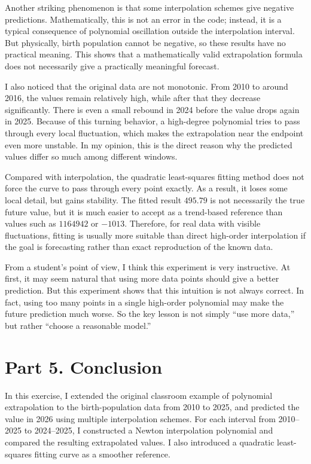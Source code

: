\documentclass[12pt,a4paper]{article}
\begin{document}
Another striking phenomenon is that some interpolation schemes give negative predictions. Mathematically, this is not an error in the code; instead, it is a typical consequence of polynomial oscillation outside the interpolation interval. But physically, birth population cannot be negative, so these results have no practical meaning. This shows that a mathematically valid extrapolation formula does not necessarily give a practically meaningful forecast.

I also noticed that the original data are not monotonic. From 2010 to around 2016, the values remain relatively high, while after that they decrease significantly. There is even a small rebound in 2024 before the value drops again in 2025. Because of this turning behavior, a high-degree polynomial tries to pass through every local fluctuation, which makes the extrapolation near the endpoint even more unstable. In my opinion, this is the direct reason why the predicted values differ so much among different windows.

Compared with interpolation, the quadratic least-squares fitting method does not force the curve to pass through every point exactly. As a result, it loses some local detail, but gains stability. The fitted result \(495.79\) is not necessarily the true future value, but it is much easier to accept as a trend-based reference than values such as \(1164942\) or \(-1013\). Therefore, for real data with visible fluctuations, fitting is usually more suitable than direct high-order interpolation if the goal is forecasting rather than exact reproduction of the known data.

From a student's point of view, I think this experiment is very instructive. At first, it may seem natural that using more data points should give a better prediction. But this experiment shows that this intuition is not always correct. In fact, using too many points in a single high-order polynomial may make the future prediction much worse. So the key lesson is not simply ``use more data,'' but rather ``choose a reasonable model.''

\section{Part 5. Conclusion}

In this exercise, I extended the original classroom example of polynomial extrapolation to the birth-population data from 2010 to 2025, and predicted the value in 2026 using multiple interpolation schemes. For each interval from 2010--2025 to 2024--2025, I constructed a Newton interpolation polynomial and compared the resulting extrapolated values. I also introduced a quadratic least-squares fitting curve as a smoother reference.
\end{document}
